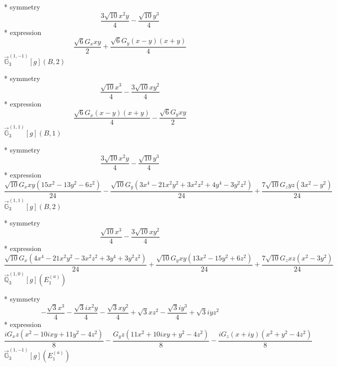\documentclass[fleqn,8pt]{jsarticle}
\begin{document}
\noindent\quad ** symmetry
\begin{dmath*}
\frac{3 \sqrt{10} x^{2} y}{4} - \frac{\sqrt{10} y^{3}}{4}
\end{dmath*}
\noindent\quad ** expression
\begin{dmath*}
\frac{\sqrt{6} G_{x} x y}{2} + \frac{\sqrt{6} G_{y} \left(x - y\right) \left(x + y\right)}{4}
\end{dmath*}
\noindent\quad $\vec{\mathbb{G}}_{3}^{(1,-1)}[g](B,2)$

\noindent\quad ** symmetry
\begin{dmath*}
\frac{\sqrt{10} x^{3}}{4} - \frac{3 \sqrt{10} x y^{2}}{4}
\end{dmath*}
\noindent\quad ** expression
\begin{dmath*}
\frac{\sqrt{6} G_{x} \left(x - y\right) \left(x + y\right)}{4} - \frac{\sqrt{6} G_{y} x y}{2}
\end{dmath*}
\noindent\quad $\vec{\mathbb{G}}_{3}^{(1,1)}[g](B,1)$

\noindent\quad ** symmetry
\begin{dmath*}
\frac{3 \sqrt{10} x^{2} y}{4} - \frac{\sqrt{10} y^{3}}{4}
\end{dmath*}
\noindent\quad ** expression
\begin{dmath*}
\frac{\sqrt{10} G_{x} x y \left(15 x^{2} - 13 y^{2} - 6 z^{2}\right)}{24} - \frac{\sqrt{10} G_{y} \left(3 x^{4} - 21 x^{2} y^{2} + 3 x^{2} z^{2} + 4 y^{4} - 3 y^{2} z^{2}\right)}{24} + \frac{7 \sqrt{10} G_{z} y z \left(3 x^{2} - y^{2}\right)}{24}
\end{dmath*}
\noindent\quad $\vec{\mathbb{G}}_{3}^{(1,1)}[g](B,2)$

\noindent\quad ** symmetry
\begin{dmath*}
\frac{\sqrt{10} x^{3}}{4} - \frac{3 \sqrt{10} x y^{2}}{4}
\end{dmath*}
\noindent\quad ** expression
\begin{dmath*}
\frac{\sqrt{10} G_{x} \left(4 x^{4} - 21 x^{2} y^{2} - 3 x^{2} z^{2} + 3 y^{4} + 3 y^{2} z^{2}\right)}{24} + \frac{\sqrt{10} G_{y} x y \left(13 x^{2} - 15 y^{2} + 6 z^{2}\right)}{24} + \frac{7 \sqrt{10} G_{z} x z \left(x^{2} - 3 y^{2}\right)}{24}
\end{dmath*}
\noindent\quad $\vec{\mathbb{Q}}_{3}^{(1,0)}[g](E_{1}^{(a)})$

\noindent\quad ** symmetry
\begin{dmath*}
- \frac{\sqrt{3} x^{3}}{4} - \frac{\sqrt{3} i x^{2} y}{4} - \frac{\sqrt{3} x y^{2}}{4} + \sqrt{3} x z^{2} - \frac{\sqrt{3} i y^{3}}{4} + \sqrt{3} i y z^{2}
\end{dmath*}
\noindent\quad ** expression
\begin{dmath*}
\frac{i G_{x} z \left(x^{2} - 10 i x y + 11 y^{2} - 4 z^{2}\right)}{8} - \frac{G_{y} z \left(11 x^{2} + 10 i x y + y^{2} - 4 z^{2}\right)}{8} - \frac{i G_{z} \left(x + i y\right) \left(x^{2} + y^{2} - 4 z^{2}\right)}{8}
\end{dmath*}
\noindent\quad $\vec{\mathbb{G}}_{3}^{(1,-1)}[g](E_{1}^{(a)})$
\end{document}
